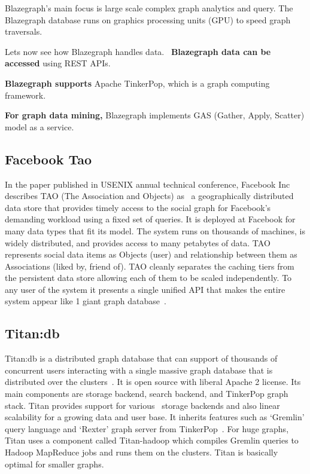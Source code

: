      Blazegraph’s main focus is large scale complex graph analytics
     and query.  The Blazegraph database runs on graphics processing
     units (GPU) to speed graph traversals.~\cite{paper-blzgraph}

     Lets now see how Blazegraph handles data.~\cite{www-blzgraph} 
     {\bf Blazegraph data can be accessed} using REST APIs. 

     {\bf Blazegraph supports} Apache TinkerPop, which is a graph
      computing framework.

     {\bf For graph data mining,} Blazegraph implements GAS (Gather, Apply, 
     Scatter) model as a service.

     \pv

\subsection{Facebook Tao}

In the paper published in USENIX annual technical conference, Facebook
Inc describes TAO (The Association and Objects) as~\cite{book-tao} a
geographically distributed data store that provides timely access to
the social graph for Facebook’s demanding workload using a fixed set
of queries. It is deployed at Facebook for many data types that fit
its model. The system runs on thousands of machines, is widely
distributed, and provides access to many petabytes of data. TAO
represents social data items as Objects (user) and relationship
between them as Associations (liked by, friend of).  TAO cleanly
separates the caching tiers from the persistent data store allowing
each of them to be scaled independently. To any user of the system it
presents a single unified API that makes the entire system appear like
1 giant graph database~\cite{www-tao}.

     \pv

\subsection{Titan:db}

Titan:db is a distributed graph database that can support of thousands
of concurrent users interacting with a single massive graph database
that is distributed over the clusters~\cite{www-Titan}. It is open
source with liberal Apache 2 license. Its main components are storage
backend, search backend, and TinkerPop graph stack. Titan provides
support for various  storage backends and also linear scalability for
a growing data and user base. It inherits features such as ‘Gremlin’
query language and ‘Rexter’ graph server from
TinkerPop~\cite{www-TinkerPop}.  For huge graphs, Titan uses a
component called Titan-hadoop which compiles Gremlin queries to Hadoop
MapReduce jobs and runs them on the clusters. Titan is basically
optimal for smaller graphs.

